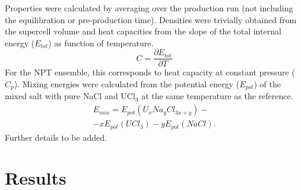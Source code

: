\documentclass[preprint,3p,10pt,twocolumn,number,sort&compress]{elsarticle}
\begin{document}
Properties were calculated by averaging over the production run (not including the equilibration or pre-production time). Densities were trivially obtained from the supercell volume and heat capacities from the slope of the total internal energy ($E_{tot}$) as function of temperature. 
\begin{equation}
C=\frac{\partial E_{tot}}{\partial T}
\end{equation}
For the NPT ensemble, this corresponds to heat capacity at constant pressure ($C_p$). 
 Mixing energies were calculated from the potential energy ($E_{pot}$) of the mixed salt with pure NaCl and UCl$_3$ at the same temperature as the reference. 
\begin{equation}
\begin{split}
E_{mix}=E_{pot}(U_xNa_yCl_{3x+y})- \\
-xE_{pot}(UCl_3)-yE_{pot}(NaCl).
\end{split}
\end{equation}
{\color{red}Further details to be added}.


\section{Results}
\label{sec:results}
\end{document}
